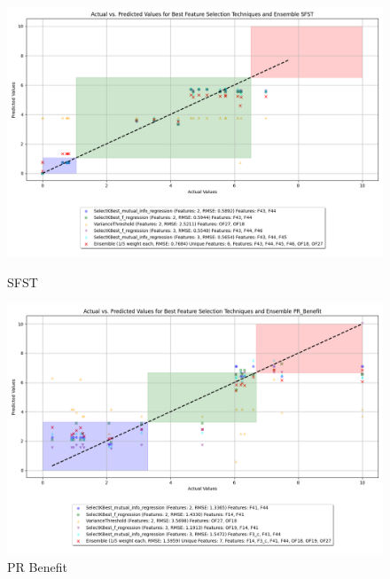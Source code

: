 \begin{figure}[H]
    \centering
    \begin{minipage}{0.45\textwidth}
        \centering
        \includegraphics[width=\linewidth]{reg_section_all/images_reg_featred_ensemble/actual_vs_predicted_smallest_feature_selection_and_ensemble_SFST.png}
        \caption{SFST}
        \label{fig:sfst_reg_featred_smallest_ensemble}
    \end{minipage}\hfill
    \begin{minipage}{0.45\textwidth}
        \centering
        \includegraphics[width=\linewidth]{reg_section_all/images_reg_featred_ensemble/actual_vs_predicted_smallest_feature_selection_and_ensemble_PR_Benefit.png}
        \caption{PR Benefit}
        \label{fig:pr_ben_reg_featred_smallest_ensemble}
    \end{minipage}
\end{figure}

